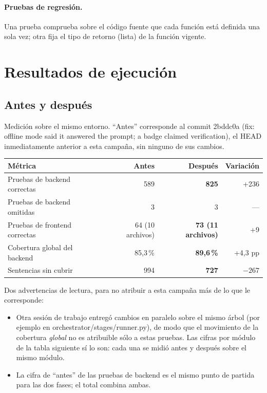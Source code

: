 \documentclass[11pt,a4paper]{article}
\newcommand{\code}[1]{{\ttfamily\small\def\_{\textunderscore\allowbreak}#1}}
\begin{document}
\paragraph{Pruebas de regresión.} Una prueba comprueba sobre el código fuente que cada
función está definida una sola vez; otra fija el tipo de retorno (lista) de la función
vigente.

\section{Resultados de ejecución}
\label{sec:resultados}

\subsection*{Antes y después}

Medición sobre el mismo entorno. ``Antes'' corresponde al commit \code{2bddc0a}
(\code{fix: offline mode said it answered the prompt; a badge claimed verification}), el
HEAD inmediatamente anterior a esta campaña, sin ninguno de sus cambios.

\begin{center}
\begin{tabular}{lrrr}
\toprule
\textbf{Métrica} & \textbf{Antes} & \textbf{Después} & \textbf{Variación} \\
\midrule
Pruebas de backend correctas      & 589 & \textbf{825} & +236 \\
Pruebas de backend omitidas       & 3   & 3            & --- \\
Pruebas de frontend correctas     & 64 (10 archivos) & \textbf{73 (11 archivos)} & +9 \\
\midrule
Cobertura global del backend      & 85{,}3\,\% & \textbf{89{,}6\,\%} & +4{,}3 pp \\
Sentencias sin cubrir             & 994 & \textbf{727} & $-267$ \\
\bottomrule
\end{tabular}
\end{center}

\noindent
Dos advertencias de lectura, para no atribuir a esta campaña más de lo que le corresponde:

\begin{itemize}[leftmargin=1.4em,itemsep=1pt]
\item Otra sesión de trabajo entregó cambios en paralelo sobre el mismo árbol (por ejemplo
      en \code{orchestrator/stages/runner.py}), de modo que el movimiento de la cobertura
      \emph{global} no es atribuible sólo a estas pruebas. Las cifras por módulo de la tabla
      siguiente sí lo son: cada una se midió antes y después sobre el mismo módulo.
\item La cifra de ``antes'' de las pruebas de backend es el mismo punto de partida para las
      dos fases; el total combina ambas.
\end{itemize}
\end{document}
